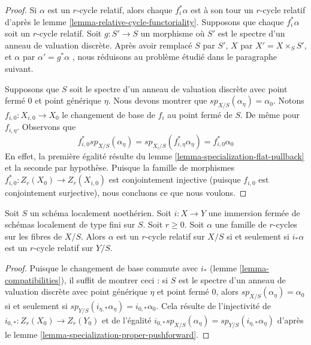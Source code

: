 \begin{proof} 
Si  $\alpha$  est un  $r$-cycle relatif, alors chaque  $f_i^*\alpha$ est à 
son tour un $r$-cycle relatif d'après le lemme  \ref{lemma-relative-cycle-functoriality}. Supposons
 que chaque  $f_i^*\alpha$  soit un  $r$-cycle relatif.
 Soit  $g : S' \to S$  un morphisme où  $S'$  est le spectre d'un anneau de 
valuation discrète. Après avoir remplacé  $S$  par  $S'$,  $X$  par  $X' = X \times_S S'$, et 
$\alpha$  par  $\alpha' = g^*\alpha$
 , nous réduisons au problème étudié dans le paragraphe suivant. 

\medskip\noindent
 Supposons que  $S$  soit le spectre d'un anneau de valuation discrète avec point 
fermé  $0$  et point générique  $\eta$. Nous devons montrer que 
$sp_{X/S}(\alpha_\eta) = \alpha_0$. Notons  $f_{i, 0} : X_{i, 0} \to X_0$
  le changement de base de  $f_i$  au point fermé de  $S$. De même 
pour  $f_{i, \eta}$.
 Observons que 
$$
f_{i, 0}^*sp_{X/S}(\alpha_\eta) =
sp_{X_i/S}(f_{i, \eta}^*\alpha_\eta) = f_{i, 0}^*\alpha_0
$$
 En effet, la première égalité résulte du 
lemme  \ref{lemma-specialization-flat-pullback}  et
 la seconde par hypothèse. Puisque la famille de morphismes  
$f_{i, 0}^* : Z_r(X_0) \to Z_r(X_{i, 0})$  est 
conjointement injective (puisque  $f_{i, 0}$  est conjointement
 surjective), nous concluons ce que nous voulons. 
\end{proof} 

\begin{lemma} 
\label{lemma-check-after-closed} 
Soit  $S$  un schéma localement noethérien. Soit  $i : X \to Y$  une immersion fermée 
de schémas localement de type fini sur  $S$. Soit  $r \geq 0$. 
Soit  $\alpha$  une famille de  $r$-cycles sur les fibres de $X/S$. 
Alors  $\alpha$  est un  $r$-cycle relatif sur $X/S$  si et seulement si  
$i_*\alpha$  est un  $r$-cycle relatif sur $Y/S$. 
\end{lemma} 

\begin{proof} 
Puisque le changement de base commute avec  $i_*$  (lemme \ref{lemma-compatibilities}),
 il suffit de montrer ceci : si  $S$  est le spectre d'un anneau de 
valuation discrète avec point générique  $\eta$  et point fermé  $0$, 
alors  $sp_{X/S}(\alpha_\eta) = \alpha_0$  si et seulement si  
$sp_{Y/S}(i_{\eta, *}\alpha_\eta) = i_{0, *}\alpha_0$. 
Cela résulte de l'injectivité de  $i_{0, *} : Z_r(X_0) \to Z_r(Y_0)$
 et de l'égalité  $i_{0, *}sp_{X/S}(\alpha_\eta) =
sp_{Y/S}(i_{\eta, *}\alpha_\eta)$  d'après
 le lemme  \ref{lemma-specialization-proper-pushforward}. 
\end{proof} 

